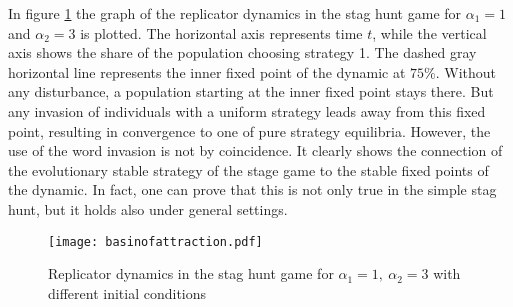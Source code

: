 In figure \ref{fig:basinofattraction} the graph of the replicator dynamics
in the stag hunt game for $\alpha_1=1$ and $\alpha_2=3$ is plotted. The
horizontal axis represents time $t$, while the vertical axis shows
the share of the population choosing strategy 1. The dashed gray horizontal
line represents the inner fixed point of the dynamic at $75\%$.
Without any disturbance, a population starting at the inner fixed point 
stays there. But any invasion of individuals with a uniform strategy leads away 
from this fixed point, resulting in convergence to one of pure 
strategy equilibria. 
However, the use of the word invasion is not by coincidence. 
It clearly shows the connection of the evolutionary stable strategy 
of the stage game to the stable fixed points of the dynamic. 
In fact, one can prove that this is not
only true in the simple stag hunt, but it holds also under general settings.
\begin{figure}
 \centering
        \texttt{[image: basinofattraction.pdf]}
        \caption[Replicator dynamic of the stag hunt game]{Replicator dynamics in the stag hunt game for 
                $\alpha_1=1,\ \alpha_2=3$ with different initial conditions}
                \label{fig:basinofattraction}
\end{figure}

